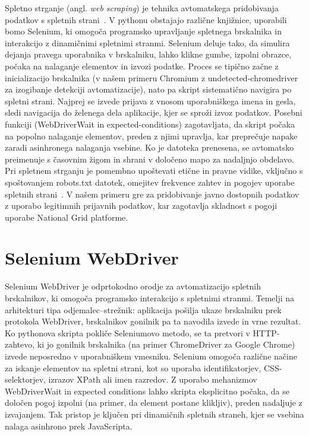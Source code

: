 \documentclass[a4paper,12pt,openright]{book}
\begin{document}
Spletno strganje (angl. \textit{web scraping}) je tehnika avtomatskega pridobivanja podatkov s spletnih strani~\cite{mitchell2018}. V pythonu obstajajo različne knjižnice, uporabili bomo Selenium, ki omogoča programsko upravljanje spletnega brskalnika in interakcijo z dinamičnimi spletnimi stranmi.
Selenium deluje tako, da simulira dejanja pravega uporabnika v brskalniku, lahko klikne gumbe, izpolni obrazce, počaka na nalaganje elementov in izvozi podatke. Proces se tipično začne z inicializacijo brskalnika (v našem primeru Chromium z undetected-chromedriver za izogibanje detekciji avtomatizacije), nato pa skript sistematično navigira po spletni strani. Najprej se izvede prijava z vnosom uporabniškega imena in gesla, sledi navigacija do želenega dela aplikacije, kjer se sproži izvoz podatkov. Posebni funkciji (WebDriverWait in expected-conditions)  zagotavljata, da skript počaka na popolno nalaganje elementov, preden z njimi upravlja, kar preprečuje napake zaradi asinhronega nalaganja vsebine. Ko je datoteka prenesena, se avtomatsko preimenuje s časovnim žigom in shrani v določeno mapo za nadaljnjo obdelavo.
Pri spletnem strganju je pomembno upoštevati etične in pravne vidike, vključno s spoštovanjem robots.txt datotek, omejitev frekvence zahtev in pogojev uporabe spletnih strani~\cite{bravi2023}. V našem primeru gre za pridobivanje javno dostopnih podatkov z uporabo legitimnih prijavnih podatkov, kar zagotavlja skladnost s pogoji uporabe National Grid platforme.

\section{Selenium WebDriver}
Selenium WebDriver je odprtokodno orodje za avtomatizacijo spletnih brskalnikov, ki omogoča programsko interakcijo s spletnimi stranmi. Temelji na arhitekturi tipa odjemalec–strežnik: aplikacija pošilja ukaze brskalniku prek protokola WebDriver, brskalnikov gonilnik pa ta navodila izvede in vrne rezultat. Ko pythonova skripta pokliče Seleniumovo metodo, se ta pretvori v HTTP-zahtevo, ki jo gonilnik brskalnika (na primer ChromeDriver za Google Chrome) izvede neposredno v uporabniškem vmesniku. Selenium omogoča različne načine za iskanje elementov na spletni strani, kot so uporaba identifikatorjev, CSS-selektorjev, izrazov XPath ali imen razredov. Z uporabo mehanizmov WebDriverWait in expected conditions lahko skripta eksplicitno počaka, da se določen pogoj izpolni (na primer, da element postane klikljiv), preden nadaljuje z izvajanjem. Tak pristop je ključen pri dinamičnih spletnih straneh, kjer se vsebina nalaga asinhrono prek JavaScripta.
\end{document}
